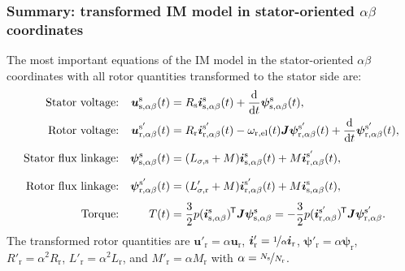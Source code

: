 \begin{frame}
	\frametitle{Summary: transformed IM model in stator-oriented $\alpha\beta$ coordinates}
    The most important equations of the IM model in the stator-oriented $\alpha\beta$ coordinates with all rotor quantities transformed to the stator side are:
    \begin{equation*}
        \begin{alignedat}{4}
            &&\mbox{Stator voltage:}&& \quad\bm{u}^\mathrm{s}_\mathrm{s,\alpha\beta}(&t) &&= R_\mathrm{s} \bm{i}^\mathrm{s}_\mathrm{s,\alpha\beta}(t)+ \frac{\mathrm{d}}{\mathrm{d}t}\bm{\psi}^\mathrm{s}_\mathrm{s,\alpha\beta}(t),\\
            &&\mbox{Rotor voltage:}&& \quad\bm{u}^{\mathrm{s}'}_\mathrm{r,\alpha\beta}(&t) &&= R_\mathrm{r} \bm{i}^{\mathrm{s}'}_\mathrm{r,\alpha\beta}(t)-\omega_\mathrm{r,el}(t)\bm{J}\bm{\psi}^{\mathrm{s}'}_\mathrm{r,\alpha\beta}(t) +\frac{\mathrm{d}}{\mathrm{d}t}\bm{\psi}^{\mathrm{s}'}_\mathrm{r,\alpha\beta}(t),\\
            &&\mbox{Stator flux linkage:}&& \quad \bm{\psi}^\mathrm{s}_\mathrm{s,\alpha\beta}(&t) &&= (L_{\sigma,\mathrm{s}} +M) \bm{i}^\mathrm{s}_{\mathrm{s},\alpha\beta}(t) +  M\bm{i}^{\mathrm{s}'}_{\mathrm{r},\alpha\beta}(t),\vphantom{\frac{\mathrm{d}}{\mathrm{d}t}}\\
            &&\mbox{Rotor flux linkage:}&& \quad \bm{\psi}^{\mathrm{s}'}_\mathrm{r,\alpha\beta}(&t) &&= (L'_{\sigma,\mathrm{r}} + M) \bm{i}^{\mathrm{s}'}_{\mathrm{r},\alpha\beta}(t) +  M \bm{i}^\mathrm{s}_{\mathrm{s},\alpha\beta}(t)\vphantom{\frac{\mathrm{d}}{\mathrm{d}t}},\\
            &&\mbox{Torque:}&& \quad T(&t) &&= \frac{3}{2} p (\bm{i}_\mathrm{s,\alpha\beta}^\mathrm{s})\T\bm{J}\bm{\psi}_\mathrm{s,\alpha\beta}^\mathrm{s}=-\frac{3}{2} p (\bm{i}^{\mathrm{s}'}_\mathrm{r,\alpha\beta})\T\bm{J}\bm{\psi}^{\mathrm{s}'}_\mathrm{r,\alpha\beta} \vphantom{\frac{\mathrm{d}}{\mathrm{d}t}}. 
        \end{alignedat}
    \end{equation*}
    The transformed rotor quantities are $\bm{u}'_\mathrm{r} = \alpha\bm{u}_\mathrm{r}$, $\bm{i}'_\mathrm{r} = \nicefrac{1}{\alpha}\bm{i}_\mathrm{r}$, $\bm{\psi}'_\mathrm{r} = \alpha\bm{\psi}_\mathrm{r}$, $R'_\mathrm{r} =  \alpha^2 R_\mathrm{r}$, $L'_\mathrm{r} =  \alpha^2 L_\mathrm{r}$, and $M'_\mathrm{r} =  \alpha M_\mathrm{r}$ with $\alpha = \nicefrac{N_\mathrm{s}}{N_\mathrm{r}}$.
\end{frame}

